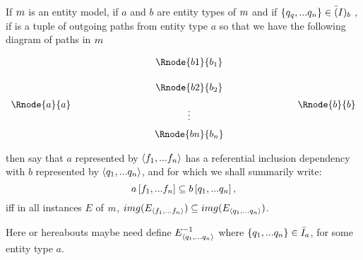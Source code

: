 
\begin{definition}
If ${m}$ is an entity model, 
if $a$ and $b$ are entity types of  ${m}$ and  if $\left\{q_q,...q_n\right\} \in \bar(I)_b$
,
if \fntuple is a tuple of outgoing paths from entity type $a$  
so that we have the following diagram of paths in ${m}$
\setlength{\arraycolsep}{.2cm}
\begin{center}
$
\begin{array}{cp{2cm}ccp{2cm}c}
             & &         & \Rnode{b1}{b_1} &&               \\ [0.5cm]
						 & &         & \Rnode{b2}{b_2} &&               \\ [0.2cm]
\Rnode{a}{a} & &         &                 &&  \Rnode{b}{b} \\ [-0.2cm]						
             & &         &    \vdots       &&               \\ [0.2cm]
             & &         & \Rnode{bn}{b_n} &&               \\ 
\end{array}
$
\end{center}
then say that $a$ represented by $\langle f_1,...f_n\rangle$ 
has a referential inclusion dependency with $b$ represented by $\langle q_1,...q_n\rangle$, and for which we shall summarily write:
$$
a\left[f_1,...f_n\right]\subseteq b\left[q_1,...q_n\right],
$$
iff in all instances $E$ of ${m}$,
$img(E_{\langle f_1,...f_n\rangle}) \subseteq img(E_{\langle q_1,...q_n\rangle})$. 
\end{definition}

Here or hereabouts maybe need define $E_{\langle q_1,...q_n\rangle}^{-1}$ where $\left\{q_1,...q_n\right\} \in \bar{I}_a$, for some entity 
type $a$.

